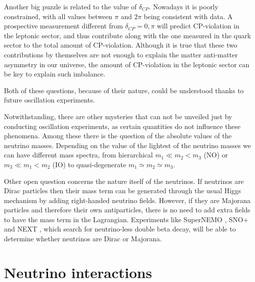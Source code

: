 Another big puzzle is related to the value of $\delta_{CP}$. Nowadays it is poorly constrained, with all values between $\pi$ and $2\pi$ being consistent with data. A prospective measurement different from $\delta_{CP}=0,\pi$ will predict CP-violation in the leptonic sector, and thus contribute along with the one measured in the quark sector to the total amount of CP-violation. Although it is true that these two contributions by themselves are not enough to explain the matter anti-matter asymmetry in our universe, the amount of CP-violation in the leptonic sector can be key to explain such imbalance.

Both of these questions, because of their nature, could be understood thanks to future oscillation experiments.

Notwithstanding, there are other mysteries that can not be unveiled just by conducting oscillation experiments, as certain quantities do not influence these phenomena. Among these there is the question of the absolute values of the neutrino masses. Depending on the value of the lightest of the neutrino masses we can have different mass spectra, from hierarchical $m_{1} \ll m_{2}<m_{3}$ (NO) or $m_{3} \ll m_{1}<m_{2}$ (IO) to quasi-degenerate $m_{1} \simeq m_{2} \simeq m_{3}$.

Other open question concerns the nature itself of the neutrinos. If neutrinos are Dirac particles then their mass term can be generated through the usual Higgs mechanism by adding right-handed neutrino fields. However, if they are Majorana particles and therefore their own antiparticles, there is no need to add extra fields to have the mass term in the Lagrangian. Experiments like SuperNEMO \cite{SuperNEMO2010}, SNO+ \cite{SNO2015} and NEXT \cite{NEXT2020}, which search for neutrino-less double beta decay, will be able to determine whether neutrinos are Dirac or Majorana.

\section{Neutrino interactions}

